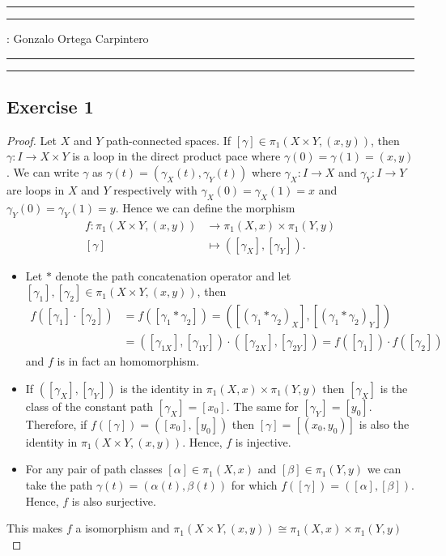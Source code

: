 \documentclass[11pt,a4paper]{article}
\begin{document}
\hrule\hrule
\vspace{1mm}


\vspace{1mm}

 : Gonzalo Ortega Carpintero
\vspace{2mm}

\hrule\hrule

\subsection*{Exercise 1}
\begin{proof}
Let $X$ and $Y$ path-connected spaces. If $[\gamma] \in \pi_1(X \times Y, (x, y)) $, then $ \gamma \colon I \to X \times Y $ is a loop in the direct product pace where $ \gamma(0) = \gamma(1) = (x,y) $. We can write $ \gamma $ as
$
  \gamma(t) = (\gamma_X(t), \gamma_Y(t))
$
where $ \gamma_X \colon I \to X $ and $ \gamma_Y \colon I \to Y $ are loops in $ X $ and $ Y $ respectively with $ \gamma_X(0) = \gamma_X(1) = x $ and $ \gamma_Y(0) = \gamma_Y(1) = y $. Hence we can define the morphism
\begin{align*}
  f \colon \pi_1(X \times Y, (x, y)) &\to \pi_1(X, x) \times \pi_1(Y,y) \\
  [\gamma] &\mapsto ([\gamma_X], [\gamma_Y]).
\end{align*}
\begin{itemize}
  \item Let $*$ denote the path concatenation operator and let $ [\gamma_1], [\gamma_2] \in \pi_1(X \times Y, (x, y)) $, then
  \begin{align*}
    f([\gamma_1]\cdot[\gamma_2]) &= f([\gamma_1 * \gamma_2]) = ([(\gamma_1 * \gamma_2)_X], [(\gamma_1 * \gamma_2)_Y]) \\
    &= ([\gamma_{1X}], [\gamma_{1Y}]) \cdot ([\gamma_{2X}], [\gamma_{2Y}]) = f([\gamma_1]) \cdot f([\gamma_2])
  \end{align*}
  and $f$ is in fact an homomorphism.

  \item If $ ([\gamma_X], [\gamma_Y]) $ is the identity in $\pi_1(X, x) \times \pi_1(Y,y)$ then $ [\gamma_X] $ is the class of the constant path $ [\gamma_X] = [x_0]$. The same for $ [\gamma_Y] = [y_0]$. Therefore, if $ f([\gamma]) = ([x_0], [y_0]) $ then $ [\gamma] = [(x_0, y_0)] $ is also the identity in $ \pi_1(X \times Y, (x, y)) $. Hence, $ f $ is injective.
  
  \item For any pair of path classes $ [\alpha] \in \pi_1(X, x) $ and $ [\beta] \in \pi_1(Y,y) $ we can take the path $ \gamma(t) =(\alpha(t), \beta(t)) $ for which $ f([\gamma]) = ([\alpha], [\beta]) $. Hence, $ f $ is also surjective.
\end{itemize}
This makes $ f $ a isomorphism and $ \pi_1(X \times Y, (x, y)) \cong \pi_1(X, x) \times \pi_1(Y,y) $
\end{proof}
\end{document}
